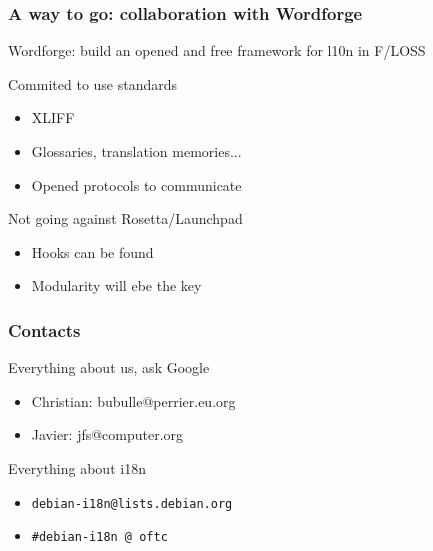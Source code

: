 \documentclass{beamer}
\begin{document}
\begin{frame}
  \frametitle{A way to go: collaboration with Wordforge}
	\begin{block}
		{Wordforge: build an opened and free framework for l10n in F/LOSS}
	\end{block}
	\begin{block}
		{Commited to use standards}
	\begin{itemize}
	\item
		{XLIFF}
	\item
		{Glossaries, translation memories...}
	\item
		{Opened protocols to communicate}
	\end{itemize}
	\end{block}
	\begin{block}
		{Not going against Rosetta/Launchpad}
	\begin{itemize}
	\item
		{Hooks can be found}
	\item
		{Modularity will ebe the key}
	\end{itemize}
	\end{block}
\end{frame}


\begin{frame}
  \frametitle{Contacts}
	\begin{block}
		{Everything about us, ask Google}
		\begin{itemize}
		\item
			{Christian: bubulle@perrier.eu.org}
		\item
			{Javier: jfs@computer.org}
		\end{itemize}
	\end{block}
	\begin{block}
		{Everything about i18n}
		\begin{itemize}
		\item
			{\texttt{debian-i18n@lists.debian.org}}
		\item
			{\texttt{\#debian-i18n @ oftc}}
		\end{itemize}
	\end{block}
\end{frame}
\end{document}
